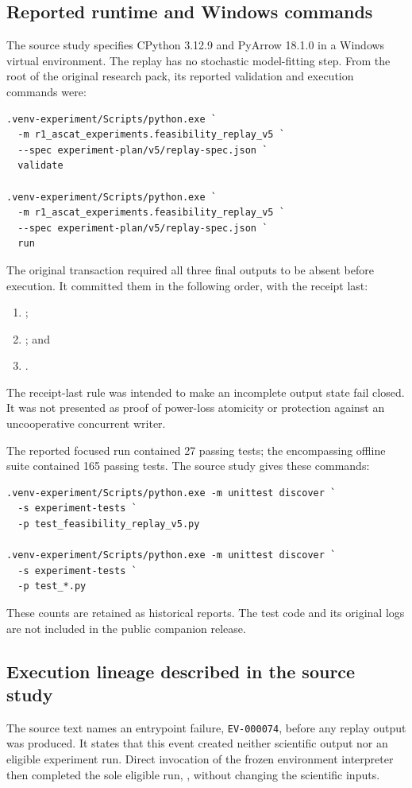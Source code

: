 \subsection{Reported runtime and Windows commands}
The source study specifies CPython 3.12.9 and PyArrow 18.1.0 in a Windows virtual environment. The replay has no stochastic model-fitting step. From the root of the original research pack, its reported validation and execution commands were:

{\small
\begin{verbatim}
.venv-experiment/Scripts/python.exe `
  -m r1_ascat_experiments.feasibility_replay_v5 `
  --spec experiment-plan/v5/replay-spec.json `
  validate

.venv-experiment/Scripts/python.exe `
  -m r1_ascat_experiments.feasibility_replay_v5 `
  --spec experiment-plan/v5/replay-spec.json `
  run
\end{verbatim}
}

The original transaction required all three final outputs to be absent before execution. It committed them in the following order, with the receipt last:
\begin{enumerate}
\item {};
\item {}; and
\item {}.
\end{enumerate}
The receipt-last rule was intended to make an incomplete output state fail closed. It was not presented as proof of power-loss atomicity or protection against an uncooperative concurrent writer.

The reported focused run contained 27 passing tests; the encompassing offline suite contained 165 passing tests. The source study gives these commands:

{\small
\begin{verbatim}
.venv-experiment/Scripts/python.exe -m unittest discover `
  -s experiment-tests `
  -p test_feasibility_replay_v5.py

.venv-experiment/Scripts/python.exe -m unittest discover `
  -s experiment-tests `
  -p test_*.py
\end{verbatim}
}

These counts are retained as historical reports. The test code and its original logs are not included in the public companion release.

\subsection{Execution lineage described in the source study}
The source text names an entrypoint failure, \texttt{EV-000074}, before any replay output was produced. It states that this event created neither scientific output nor an eligible experiment run. Direct invocation of the frozen environment interpreter then completed the sole eligible run, , without changing the scientific inputs.


